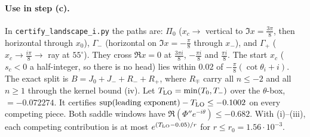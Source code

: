 \paragraph{Use in step (c).} In \texttt{certify\_landscape\_i.py} the paths are: $\Pi_0$ ($x_c\to$ vertical
to $\Im x=\frac{3\pi}8$, then horizontal through $x_0$), $\Gamma_-$ (horizontal on $\Im x=-\frac\pi8$ through $x_-$),
and $\Gamma_+$ ($x_c\to\frac{i\pi}8\to$ ray at $55^\circ$). They cross $\Re x=0$ at $\frac{3\pi i}8$, $-\frac{\pi i}8$
and $\frac{\pi i}8$. The start $x_c$ ($s_c<0$ a half-integer, so there is no head) lies within $0.02$ of
$-\frac\pi8(\cot\theta_i+i)$. The exact split is $B=J_0+J_-+R_-+R_+$, where $R_\mp$ carry all $n\le-2$ and all
$n\ge1$ through the kernel bound (iv). Let $T_{\rm LO}=\min(T_0,T_-)$ over the $\theta$-box, $=-0.072274$. It
certifies $\sup(\text{leading exponent})-T_{\rm LO}\le-0.1002$ on every competing piece. Both saddle
windows have $\Re(\Phi''e^{-i\theta})\le-0.682$. With (i)--(iii), each competing contribution is at most
$e^{(T_{\rm LO}-0.05)/r}$ for $r\le r_0=1.56\cdot10^{-3}$.
